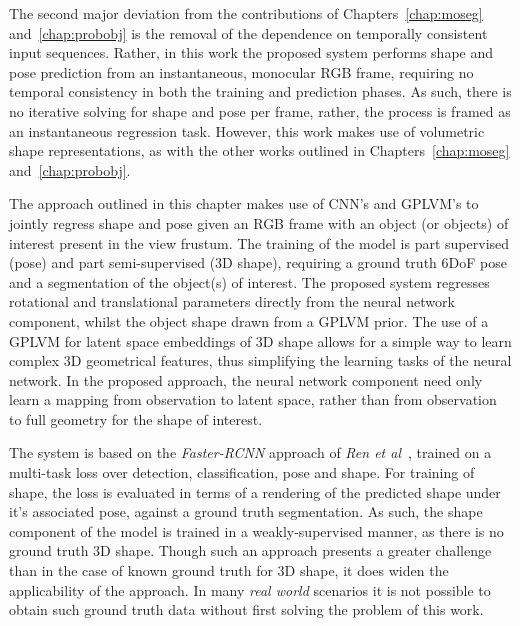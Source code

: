 The second major deviation from the contributions of Chapters~\ref{chap:moseg} and~\ref{chap:probobj} 
is the removal of the dependence on temporally consistent input sequences. Rather, in this work 
the proposed system performs shape and pose prediction from an instantaneous, monocular RGB frame, 
requiring no temporal consistency in both the training and prediction phases. As such, there is no 
iterative solving for shape and pose per frame, rather, the process is framed as an instantaneous 
regression task. However, this work makes use of volumetric shape representations, as with the other 
works outlined in Chapters~\ref{chap:moseg} and~\ref{chap:probobj}.

The approach outlined in this chapter makes use of CNN's and GPLVM's to jointly regress shape and pose 
given an RGB frame with an object (or objects) of interest present in the view frustum. The training of 
the model is part supervised (pose) and part semi-supervised (3D shape), requiring a ground truth 6DoF pose and 
a segmentation of the object(s) of interest. The proposed system regresses rotational and translational 
parameters directly from the neural network component, whilst the object shape drawn from a GPLVM prior\@. 
The use of a GPLVM for latent space embeddings of 3D shape allows for a simple way to learn complex 3D 
geometrical features, thus simplifying the learning tasks of the neural network. In the proposed approach, 
the neural network component need only learn a mapping from observation to latent space, rather than from 
observation to full geometry for the shape of interest.

The system is based on the \textit{Faster-RCNN} approach of \textit{Ren et al}~\cite{Ren2015RCNN}, trained 
on a multi-task loss over detection, classification, pose and shape. For training of shape, the loss is evaluated 
in terms of a rendering of the predicted shape under it's associated pose, against a ground truth segmentation. 
As such, the shape component of the model is trained in a weakly-supervised manner, as there is no ground truth 
3D shape. Though such an approach presents a greater challenge than in the case of known ground truth for 3D shape, 
it does widen the applicability of the approach. In many \textit{real world} scenarios it is not possible to obtain 
such ground truth data without first solving the problem of this work.

